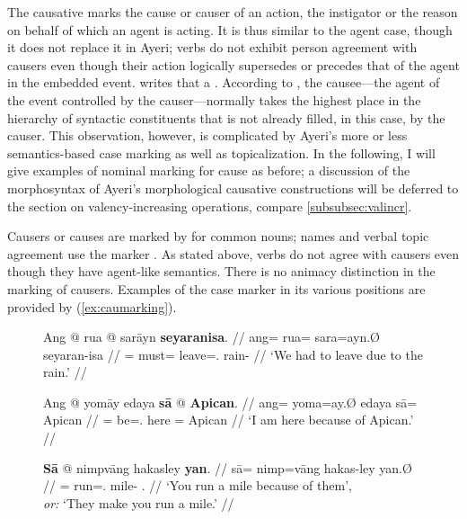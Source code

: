 The causative marks the cause or causer of an action, the instigator or the
reason on behalf of which an agent is acting. It is thus similar to the agent
case, though it does not replace it in Ayeri; verbs do not exhibit person
agreement with causers even though their action logically supersedes or
precedes that of the agent in the embedded event. \citet{dixon2000} writes that
a .
According to \citet[176]{comrie1989}, the causee---the agent of the event
controlled by the causer---normally takes the highest place in the hierarchy of
syntactic constituents that is not already filled, in this case, by the causer.
This observation, however, is complicated by Ayeri's more or less
semantics-based case marking as well as topicalization. In the following, I
will give examples of nominal marking for cause as before; a discussion of the
morphosyntax of Ayeri's morphological causative constructions will be deferred
to the section on valency-increasing operations, compare
\autoref{subsubsec:valincr}.

Causers or causes are marked by  for common nouns; names and
verbal topic agreement use the marker . As stated above, verbs do
not agree with causers even though they have agent-like semantics. There is no
animacy distinction in the marking of causers. Examples of the case marker in
its various positions are provided by (\ref{ex:caumarking}).

\begin{figure}[h]
\pex\label{ex:caumarking}
\a\begingl
	\gla Ang @ rua @ sarāyn \textbf{seyaranisa}. //
	\glb ang= rua= sara=ayn.Ø seyaran-isa //
	\glc \AgtT{}= must= leave=\Fpl{}.\Top{} rain-\Caus{} //
	\glft `We had to leave due to the rain.' //
\endgl

\a\begingl
	\gla Ang @ yomāy edaya \textbf{sā} @ \textbf{Apican}. //
	\glb ang= yoma=ay.Ø edaya sā= Apican //
	\glc \AgtT{}= be=\Fsg{}.\Top{} here \Caus{}= Apican //
	\glft `I am here because of Apican.' //
\endgl

\a\label{ex:caustop}\begingl
	\gla \textbf{Sā} @ nimpvāng hakasley \textbf{yan}. //
	\glb sā= nimp=vāng hakas-ley yan.Ø //
	\glc \CauT{}= run=\Second{}.\Aarg{} mile-\PargI{} \TplM{}.\Top{} //
	\glft `You run a mile because of them',\\
		\textit{or:} `They make you run a mile.' //
\endgl
\xe
\end{figure}

